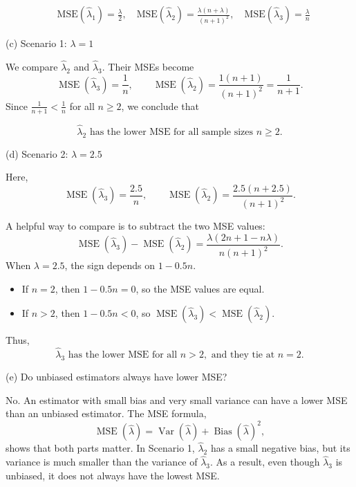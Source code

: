 \documentclass[11pt,letterpaper]{article}
\theoremstyle{remark}
\begin{document}
\[
\boxed{\begin{aligned}
&\text{MSE}(\hat{\lambda}_1) = \frac{\lambda}{2}, \quad
\text{MSE}(\hat{\lambda}_2) = \frac{\lambda(n+\lambda)}{(n+1)^2}, \quad
\text{MSE}(\hat{\lambda}_3) = \frac{\lambda}{n}
\end{aligned}}
\]

\medskip
\noindent
(c) Scenario 1: $\lambda = 1$

We compare $\hat{\lambda}_2$ and $\hat{\lambda}_3$. Their MSEs become
\[
\operatorname{MSE}(\hat{\lambda}_3) = \frac{1}{n}, \qquad
\operatorname{MSE}(\hat{\lambda}_2) = \frac{1(n+1)}{(n+1)^2}
= \frac{1}{n+1}.
\]
Since $\frac{1}{n+1} < \frac{1}{n}$ for all $n \ge 2$, we conclude that

\[
\boxed{\hat{\lambda}_2 \text{ has the lower MSE for all sample sizes } n \ge 2.}
\]

\medskip
\noindent
(d) Scenario 2: $\lambda = 2.5$

Here,
\[
\operatorname{MSE}(\hat{\lambda}_3) = \frac{2.5}{n}, \qquad
\operatorname{MSE}(\hat{\lambda}_2)
= \frac{2.5(n + 2.5)}{(n+1)^2}.
\]

A helpful way to compare is to subtract the two MSE values:
\[
\operatorname{MSE}(\hat{\lambda}_3) - \operatorname{MSE}(\hat{\lambda}_2)
= \frac{\lambda(2n + 1 - n\lambda)}{n(n+1)^2}.
\]
When $\lambda = 2.5$, the sign depends on $1 - 0.5n$.

\begin{itemize}
    \item If $n = 2$, then $1 - 0.5n = 0$, so the MSE values are equal.
    \item If $n > 2$, then $1 - 0.5n < 0$, so $\operatorname{MSE}(\hat{\lambda}_3) < \operatorname{MSE}(\hat{\lambda}_2)$.
\end{itemize}

Thus,
\[
\boxed{\hat{\lambda}_3 \text{ has the lower MSE for all } n > 2, \text{ and they tie at } n = 2.}
\]

\medskip
\noindent
(e) Do unbiased estimators always have lower MSE?

No. An estimator with small bias and very small variance can have a lower MSE than an unbiased estimator. The MSE formula,
\[
\operatorname{MSE}(\hat{\lambda})
= \operatorname{Var}(\hat{\lambda}) + \operatorname{Bias}(\hat{\lambda})^2,
\]
shows that both parts matter. In Scenario 1, $\hat{\lambda}_2$ has a small negative bias, but its variance is much smaller than the variance of $\hat{\lambda}_3$. As a result, even though $\hat{\lambda}_3$ is unbiased, it does not always have the lowest MSE.
\end{document}
